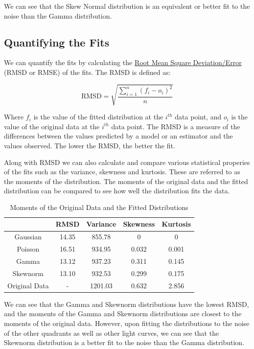 \documentclass[11pt]{book} %
\begin{document}
We can see that the Skew Normal distribution is an equivalent or better fit to the noise than the Gamma distribution.

\subsection{Quantifying the Fits}

We can quantify the fits by calculating the \href{https://en.wikipedia.org/wiki/Root-mean-square_deviation}{Root Mean Square Deviation/Error} (RMSD or RMSE) of the fits. The RMSD is defined as:

\begin{equation}
    \text{RMSD} = \sqrt{\frac{\sum_{i=1}^{n} (f_i - o_i)^2}{n}}
\end{equation}
    
    Where $f_i$ is the value of the fitted distribution at the $i^{th}$ data point, and $o_i$ is the value of the original data at the $i^{th}$ data point. The RMSD is a measure of the differences between the values predicted by a model or an estimator and the values observed. The lower the RMSD, the better the fit.

Along with RMSD we can also calculate and compare various statistical properies of the fits such as the variance, skewness and kurtosis. These are referred to as the moments of the distribution. The moments of the original data and the fitted distribution can be compared to see how well the distribution fits the data.

\begin{table}[H]
    \centering
    \begin{tabular}{c|c|c|c|c}
        & RMSD & Variance & Skewness & Kurtosis \\
        \hline
        Gaussian & 14.35 & 855.78 & 0 & 0 \\
        \hline
        Poisson & 16.51 & 934.95 & 0.032 & 0.001 \\
        \hline
        Gamma & 13.12 & 937.23 & 0.311 & 0.145 \\
        \hline
        Skewnorm & 13.10 & 932.53 & 0.299 & 0.175 \\
        \hline
        Original Data & - & 1201.03 & 0.632 & 2.856 \\
    \end{tabular}
    \caption{Moments of the Original Data and the Fitted Distributions}
\end{table}

We can see that the Gamma and Skewnorm distributions have the lowest RMSD, and the moments of the Gamma and Skewnorm distributions are closest to the moments of the original data. However, upon fitting the distributions to the noise of the other quadrants as well as other light curves, we can see that the Skewnorm distribution is a better fit to the noise than the Gamma distribution.
\end{document}
